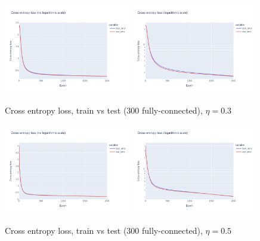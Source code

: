 \documentclass[12pt]{article}
\begin{document}
\begin{figure}[ht]
  \centering
  \includegraphics[width=0.49\textwidth]{images/cross-entropy-comparison-1-300-lr0.3.png}
  \includegraphics[width=0.49\textwidth]{images/cross-entropy-comparison-1-300-lr0.3-log.png}
  \caption{Cross entropy loss, train vs test ($300$ fully-connected), $\eta = 0.3$}
  \label{fig: learning rate comparison 0.3}
\end{figure}
\begin{figure}[ht]
  \centering
  \includegraphics[width=0.49\textwidth]{images/cross-entropy-comparison-1-300-lr0.5.png}
  \includegraphics[width=0.49\textwidth]{images/cross-entropy-comparison-1-300-lr0.5-log.png}
  \caption{Cross entropy loss, train vs test ($300$ fully-connected), $\eta = 0.5$}
  \label{fig: learning rate comparison 0.5}
\end{figure}
\end{document}
